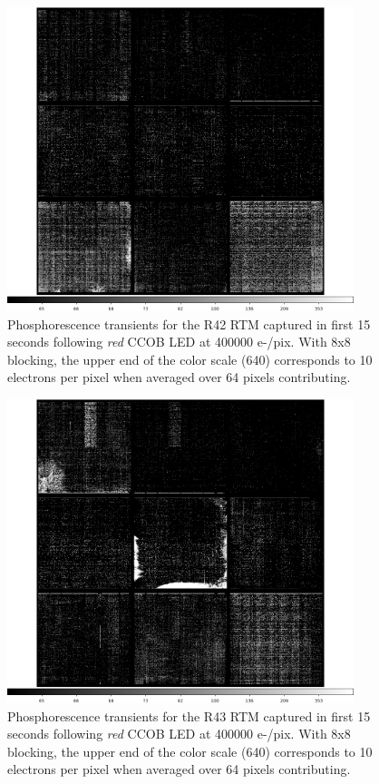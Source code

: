 \begin{figure}[!htbp]
\centering
\includegraphics[width=0.9\textwidth]{sections/figures/phosphorescence-survey/itl_fluor_R42_0-19_rb1_log.png}
\caption{Phosphorescence transients for the R42 RTM captured in first 15 seconds following {\it red} CCOB LED at 400000 e-/pix. With 8x8 blocking, the upper end of the color scale (640) corresponds to 10 electrons per pixel when averaged over 64 pixels contributing.}
\label{fig:phos:R42}
\end{figure}

\begin{figure}[!htbp]
\centering
\includegraphics[width=0.9\textwidth]{sections/figures/phosphorescence-survey/itl_fluor_R43_0-19_rb1_log.png}
\caption{Phosphorescence transients for the R43 RTM captured in first 15 seconds following {\it red} CCOB LED at 400000 e-/pix. With 8x8 blocking, the upper end of the color scale (640) corresponds to 10 electrons per pixel when averaged over 64 pixels contributing.}
\label{fig:phos:R43}
\end{figure}

